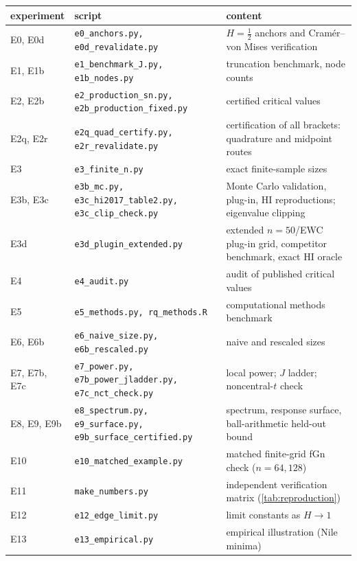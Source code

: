 \begin{tabular}{@{}l>{\raggedright}p{}>{\raggedright\arraybackslash}p{}@{}}\toprule
experiment & script & content\\\midrule
E0, E0d & \texttt{e0\_anchors.py, e0d\_revalidate.py} & $H=\frac12$ anchors and Cram\'er--von Mises verification\\
E1, E1b & \texttt{e1\_benchmark\_J.py, e1b\_nodes.py} & truncation benchmark, node counts\\
E2, E2b & \texttt{e2\_production\_sn.py, e2b\_production\_fixed.py} & certified critical values\\
E2q, E2r & \texttt{e2q\_quad\_certify.py, e2r\_revalidate.py} & certification of all brackets: quadrature and midpoint routes\\
E3 & \texttt{e3\_finite\_n.py} & exact finite-sample sizes\\
E3b, E3c & \texttt{e3b\_mc.py, e3c\_hi2017\_table2.py, e3c\_clip\_check.py} & Monte Carlo validation, plug-in, HI reproductions; eigenvalue clipping\\
E3d & \texttt{e3d\_plugin\_extended.py} & extended $n=50$/EWC plug-in grid, competitor benchmark, exact HI oracle\\
E4 & \texttt{e4\_audit.py} & audit of published critical values\\
E5 & \texttt{e5\_methods.py, rq\_methods.R} & computational methods benchmark\\
E6, E6b & \texttt{e6\_naive\_size.py, e6b\_rescaled.py} & naive and rescaled sizes\\
E7, E7b, E7c & \texttt{e7\_power.py, e7b\_power\_jladder.py, e7c\_nct\_check.py} & local power; $J$ ladder; noncentral-$t$ check\\
E8, E9, E9b & \texttt{e8\_spectrum.py, e9\_surface.py, e9b\_surface\_certified.py} & spectrum, response surface, ball-arithmetic held-out bound\\
E10 & \texttt{e10\_matched\_example.py} & matched finite-grid fGn check ($n=64,128$)\\
E11 & \texttt{make\_numbers.py} & independent verification matrix (\cref{tab:reproduction})\\
E12 & \texttt{e12\_edge\_limit.py} & limit constants as $H\to1$\\
E13 & \texttt{e13\_empirical.py} & empirical illustration (Nile minima)\\
\bottomrule\end{tabular}
